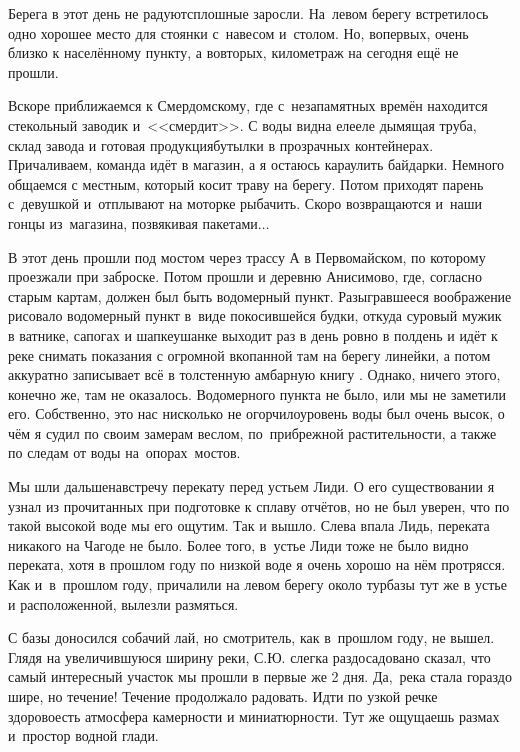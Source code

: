 Берега в этот день не радуют\mdash  сплошные заросли. На~левом берегу встретилось одно хорошее место для стоянки с~навесом и~столом. Но, во\sdash первых, очень близко к населённому пункту, а во\sdash вторых, километраж на сегодня ещё не прошли. 

Вскоре приближаемся к Смердомскому, где с~незапамятных времён находится стекольный заводик и~<<смердит>>. С воды видна еле\sdash еле дымящая труба, склад завода и готовая продукция\mdash  бутылки в прозрачных контейнерах. Причаливаем, команда идёт в магазин, а я остаюсь караулить байдарки. Немного общаемся с местным, который косит траву на берегу. Потом приходят парень с~девушкой и~отплывают на моторке рыбачить. Скоро возвращаются и~наши гонцы из~магазина, позвякивая пакетами$\ldots$ 

В этот день прошли под мостом через трассу А в Первомайском, по которому проезжали при заброске. Потом прошли и деревню Анисимово, где, согласно старым картам, должен был быть водомерный пункт. Разыгравшееся воображение рисовало водомерный пункт в~виде покосившейся будки, откуда суровый мужик в ватнике, сапогах и шапке\sdash ушанке выходит раз в день ровно в полдень и идёт к реке снимать показания с огромной вкопанной там на берегу линейки, а потом аккуратно записывает всё в толстенную амбарную книгу {}. Однако, ничего этого, конечно же, там не оказалось. Водомерного пункта не было, или мы не заметили его. Собственно, это нас нисколько не огорчило\mdash уровень воды был очень высок, о чём я судил по своим замерам веслом, по~прибрежной растительности, а также по следам от воды на~опорах~мостов. 

Мы шли дальше\mdash  навстречу перекату перед устьем Лиди. О его существовании я узнал из прочитанных при подготовке к сплаву отчётов, но не был уверен, что по такой высокой воде мы его ощутим. Так и вышло. Слева впала Лидь, переката никакого на Чагоде не было. Более того, в~устье Лиди тоже не было видно переката, хотя в прошлом году по низкой воде я очень хорошо на нём протрясся. Как и~в~прошлом году, причалили на левом берегу около турбазы тут же в устье и расположенной, вылезли размяться. 

С базы доносился собачий лай, но смотритель, как в~прошлом году, не вышел. Глядя на увеличившуюся ширину реки, С.Ю. слегка раздосадовано сказал, что самый интересный участок мы прошли в первые же 2 дня. Да,~река стала гораздо шире, но течение! Течение продолжало радовать. Идти по узкой речке здорово\mdash  есть атмосфера камерности и миниатюрности. Тут же ощущаешь размах и~простор водной глади.

